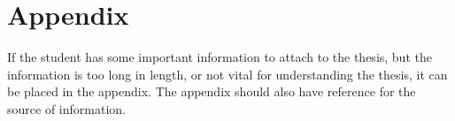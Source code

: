 \chapter{\texorpdfstring{Appendix}{}}

If the student has some important information to attach to the thesis, but the information is too long in length, or not vital for understanding the thesis, it can be placed in the appendix. The appendix should also have reference for the source of information.
